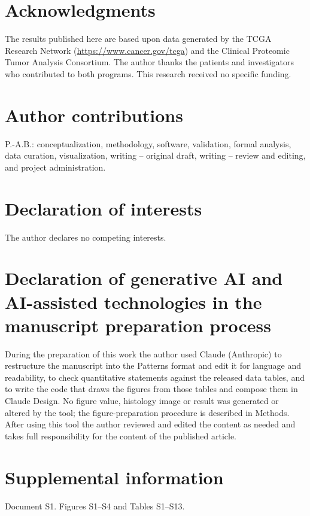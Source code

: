 \section*{Acknowledgments}

The results published here are based upon data generated by the TCGA Research
Network (\url{https://www.cancer.gov/tcga}) and the Clinical Proteomic Tumor
Analysis Consortium. The author thanks the patients and investigators who
contributed to both programs.
This research received no specific funding.

\section*{Author contributions}

P.-A.B.: conceptualization, methodology, software, validation, formal analysis,
data curation, visualization, writing -- original draft, writing -- review and
editing, and project administration.

\section*{Declaration of interests}

The author declares no competing interests.

\section*{Declaration of generative AI and AI-assisted technologies in the manuscript preparation process}

During the preparation of this work the author used Claude (Anthropic) to
restructure the manuscript into the Patterns format and edit it for language and
readability, to check quantitative statements against the released data tables,
and to write the code that draws the figures from those tables and compose them in
Claude Design. No figure value, histology image or result was generated or
altered by the tool; the figure-preparation procedure is described in Methods.
After using this tool the author reviewed and edited the content as needed and
takes full responsibility for the content of the published article.

\section*{Supplemental information}

Document S1. Figures S1--S4 and Tables S1--S13.
